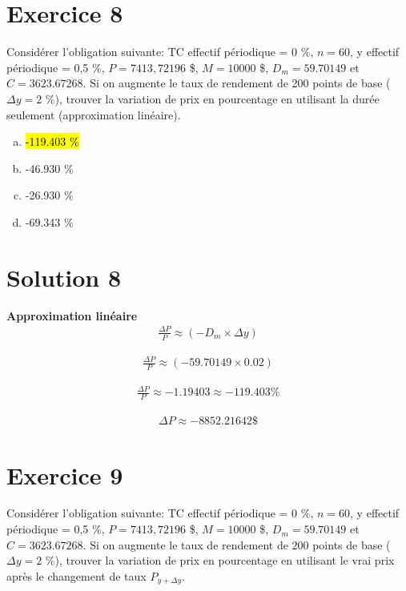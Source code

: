 \documentclass[10pt,a4paper]{article}
\begin{document}
\newpage

\section*{Exercice 8}
Considérer l’obligation suivante: TC effectif périodique = 0 \%, $n = 60$, y effectif périodique = 0,5 \%, $P = 7413,72196$ \$, $M= 10000$ \$, $D_m = 59.70149$ et $C = 3623.67268$.  Si on augmente le taux de rendement de 200 points de base ($\Delta y = 2$  \%),  trouver la variation de prix en pourcentage en utilisant la durée seulement (approximation linéaire).

\begin{enumerate}[a)]
\item \hl{-119.403 \%}
\item -46.930 \%
\item -26.930 \%
\item -69.343 \%
\end{enumerate}

\section*{Solution 8}
\textbf{Approximation linéaire}
\begin{align*}
\frac{\Delta P}{P} \approx \left( -D_m \times \Delta y \right)
\end{align*}

\begin{align*}
\frac{\Delta P}{P} \approx (-59.70149 \times 0.02)
\end{align*}

\begin{align*}
\frac{\Delta P}{P} \approx -1.19403 \approx -119.403 \%
\end{align*}

\begin{align*}
\Delta P \approx -8852.21642 \$
\end{align*}

\newpage

\section*{Exercice 9}
Considérer l’obligation suivante: TC effectif périodique = 0 \%, $n = 60$, y effectif périodique = 0,5 \%, $P = 7413,72196$ \$, $M= 10000$ \$, $D_m = 59.70149$ et $C = 3623.67268$.  Si on augmente le taux de rendement de 200 points de base ($\Delta y = 2$  \%),  trouver la variation de prix en pourcentage en utilisant le vrai prix après le changement de taux $P_{y+\Delta y}$.
\end{document}
